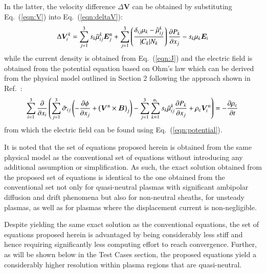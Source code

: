 \documentclass{warpdoc}
\newcommand{\mfd}{\displaystyle}
\newcommand{\ns}{{n_{\rm s}}}
\newcommand{\nd}{3}
\renewcommand{\vec}[1]{\bm{#1}}
\begin{document}
%
In the latter, the velocity difference $\Delta \vec{V}$ can be obtained by substituting Eq.\ (\ref{eqn:V}) into Eq.\ (\ref{eqn:deltaV}):
%
\begin{equation}
 \Delta \vec{V}_i^k = 
   \sum_{j=1}^\nd s_k \wtilde{\mu}^k_{ij}  \vec{E}_j^{\rm n}
      + \sum_{j=1}^\nd  \left(\frac{\delta_{ij} \mu_k-\wtilde{\mu}^{k}_{ij}}{|C_k| N_k}\right) \frac{\partial P_k}{\partial x_j}
-  s_k \mu_k  \vec{E}_i
\end{equation}
%
while the current density is obtained from Eq.\ (\ref{eqn:J}) and the electric field is obtained from the potential equation based on Ohm's law which can be derived from the physical model outlined in Section 2 following the approach shown in Ref.\ \cite{jcp:2011:parent}: 
%
\begin{equation}
\!\begin{array}{l}
  \mfd\sum_{i=1}^3 \frac{\partial}{\partial x_i}\left(\sum_{j=1}^3 \wtilde{\sigma}_{ij} \left(-\frac{\partial \phi}{\partial x_j}  + \left(\vec{V}^{\rm n} \times \vec{B}\right)_j\right) 
             - \sum_{j=1}^3 \sum_{k=1}^\ns s_k   \wtilde{\mu}^{k}_{ij}  \frac{\partial P_k}{\partial x_j}
              + \rho_{\rm c} \vec{V}_i^{\rm n}  \right)=-  \frac{\partial \rho_{\rm c}}{\partial t}
\end{array}
\end{equation}
%
from which the electric field can be found using Eq.\ (\ref{eqn:potential}).

It is noted that the set of equations proposed herein is obtained from the same physical model as the conventional set of equations without introducing any additional assumption or simplification. As such, the exact solution obtained from the proposed set of equations is identical to the one obtained from the conventional set not only for quasi-neutral plasmas with significant ambipolar diffusion and drift phenomena but also for non-neutral sheaths, for unsteady plasmas, as well as for plasmas where the displacement current is non-negligible. 

Despite yielding the same exact solution as the conventional equations, the set of equations proposed herein is advantaged  by being considerably less stiff and hence requiring significantly less computing effort to reach convergence. Further, as will be shown below in the Test Cases section, the proposed equations yield a considerably higher resolution within plasma regions that are quasi-neutral.    
\end{document}
